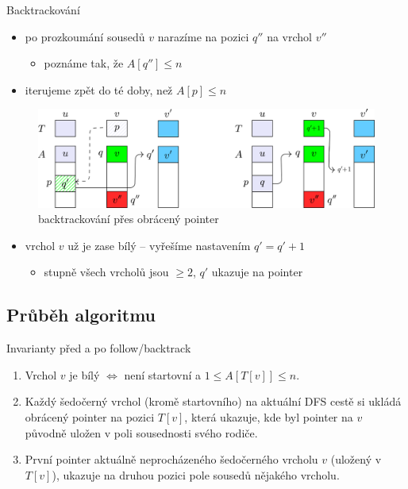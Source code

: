\documentclass[czech]{beamer}
\begin{document}
	\begin{frame}{Backtrackování}
		\begin{itemize}
			\item po prozkoumání sousedů $v$ narazíme na pozici $q''$ na vrchol $v''$
			\begin{itemize}
				\item poznáme tak, že $A[q''] \le n$
			\end{itemize}
			\item iterujeme zpět do té doby, než $A[p] \le n$
		\end{itemize}
		\begin{figure}
			\centering
			\includegraphics{images/deg2-fix.png}
			\caption{backtrackování přes obrácený pointer}
		\end{figure}
		\vfill

		\begin{itemize}
			\item vrchol $v$ už je zase bílý -- vyřešíme nastavením $q' = q' + 1$
			\begin{itemize}
				\item stupně všech vrcholů jsou $\ge 2$, $q'$ ukazuje na  pointer
			\end{itemize}
		\end{itemize}
	\end{frame}
		
	\subsection{Průběh algoritmu}

	\begin{frame}{Invarianty před a po follow/backtrack}
		\begin{enumerate}
				\item Vrchol $v$ je bílý $\iff$ není startovní a $1 \le A[T[v]] \le n$.
				\item Každý šedočerný vrchol (kromě startovního) na aktuální DFS cestě si ukládá obrácený pointer na pozici $T[v]$, která ukazuje, kde byl pointer na $v$ původně uložen v poli sousednosti svého rodiče.
				\item První pointer aktuálně neprocházeného šedočerného vrcholu $v$ (uložený v $T[v]$), ukazuje na druhou pozici pole sousedů nějakého vrcholu.
		\end{enumerate}
	\end{frame}
\end{document}
